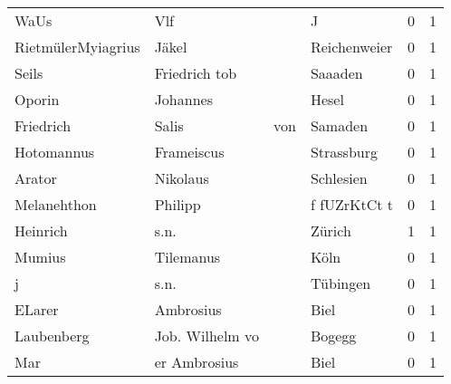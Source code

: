 \begin{tabular}{llllrr}
                     WaUs &                                Vlf &             &                                           J &          0 &         1 \\
       RietmülerMyiagrius &                              Jäkel &             &                                Reichenweier &          0 &         1 \\
                    Seils &                      Friedrich tob &             &                                     Saaaden &          0 &         1 \\
                   Oporin &                           Johannes &             &                                       Hesel &          0 &         1 \\
                Friedrich &                              Salis &         von &                                     Samaden &          0 &         1 \\
               Hotomannus &                         Frameiscus &             &                                  Strassburg &          0 &         1 \\
                   Arator &                           Nikolaus &             &                                   Schlesien &          0 &         1 \\
              Melanehthon &                            Philipp &             &                                f fUZrKtCt t &          0 &         1 \\
                 Heinrich &                               s.n. &             &                                      Zürich &          1 &         1 \\
                   Mumius &                          Tilemanus &             &                                        Köln &          0 &         1 \\
                        j &                               s.n. &             &                                    Tübingen &          0 &         1 \\
                   ELarer &                          Ambrosius &             &                                        Biel &          0 &         1 \\
               Laubenberg &                    Job. Wilhelm vo &             &                                      Bogegg &          0 &         1 \\
                      Mar &                       er Ambrosius &             &                                        Biel &          0 &         1 \\

\end{tabular}
